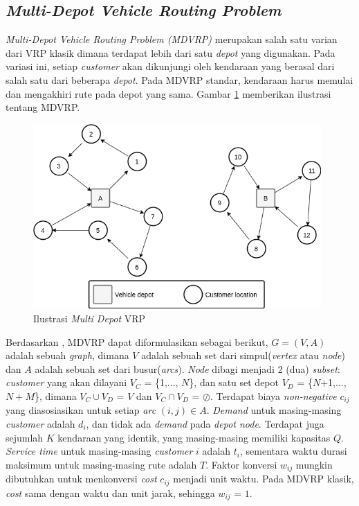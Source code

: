 \subsection{\textit{Multi-Depot Vehicle Routing Problem}}
\label{ssec:mdvrp}
\textit{Multi-Depot Vehicle Routing Problem (MDVRP)} merupakan salah satu varian dari VRP klasik dimana terdapat lebih dari satu \textit{depot} yang digunakan. Pada variasi ini, setiap \textit{customer} akan dikunjungi oleh kendaraan yang berasal dari salah satu dari beberapa \textit{depot}. Pada MDVRP standar, kendaraan harus memulai dan mengakhiri rute pada depot yang sama. Gambar \ref{fig:mdvrp-illustration} memberikan ilustrasi tentang MDVRP.


\begin{figure}[!]
	\centering
	\includegraphics[width=11cm]{Resources/Images/mdvrp-illustration}
	\caption{Ilustrasi \textit{Multi Depot} VRP}
	\label{fig:mdvrp-illustration}
\end{figure}


Berdasarkan \citep{renaud_tabu_1996}, MDVRP dapat diformulasikan sebagai berikut, $G = (V, A)$ adalah sebuah \textit{graph}, dimana $V$ adalah sebuah set dari simpul(\textit{vertex} atau \textit{node}) dan $A$ adalah sebuah set dari busur(\textit{arcs}). \textit{Node} dibagi menjadi 2 (dua) \textit{subset}: \textit{customer} yang akan dilayani $V_C$ = \{1,..., $N$\}, dan satu set depot $V_D$ = \{$N$+1,..., $N+M$\}, dimana $V_C \cup V_D$ = $V$ dan $V_C \cap V_D$ = $\oslash$. Terdapat biaya \textit{non-negative} $c_{ij}$ yang diasosiasikan untuk setiap \textit{arc} $(i, j) \in A$. \textit{Demand} untuk masing-masing \textit{customer} adalah $d_i$, dan tidak ada \textit{demand} pada \textit{depot node}. Terdapat juga sejumlah $K$ kendaraan yang identik, yang masing-masing memiliki kapasitas $Q$. \textit{Service time} untuk masing-masing \textit{customer} $i$ adalah $t_i$, sementara waktu durasi maksimum untuk masing-masing rute adalah $T$. Faktor konversi $w_{ij}$ mungkin dibutuhkan untuk menkonversi \textit{cost} $c_{ij}$ menjadi unit waktu. Pada MDVRP klasik, \textit{cost} sama dengan waktu dan unit jarak, sehingga $w_{ij}$ = $1$.


